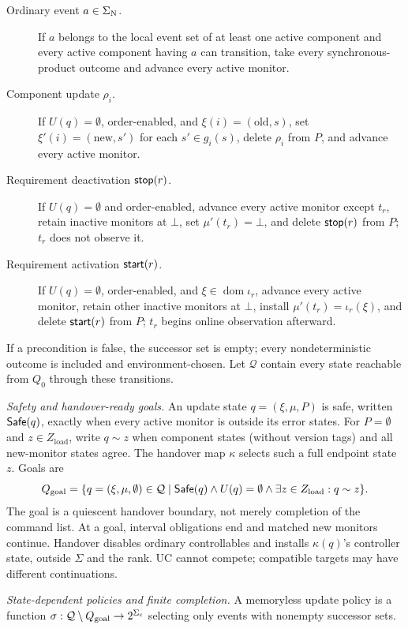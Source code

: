 \begin{description}
  \item[Ordinary event $a\in\Sigma_{\mathrm{N}}$.]
  If $a$ belongs to the local event set of at least one active component and every active component having $a$ can transition, take every synchronous-product outcome and advance every active monitor.

  \item[Component update $\rho_i$.]
  If $U(q)=\emptyset$, order-enabled, and $\xi(i)=(\mathrm{old},s)$, set $\xi'(i)=(\mathrm{new},s')$ for each $s'\in g_i(s)$, delete $\rho_i$ from $P$, and advance every active monitor.

  \item[Requirement deactivation $\mathsf{stop}(r)$.]
  If $U(q)=\emptyset$ and order-enabled, advance every active monitor except $t_r$, retain inactive monitors at $\bot$, set $\mu'(t_r)=\bot$, and delete $\mathsf{stop}(r)$ from $P$; $t_r$ does not observe it.

  \item[Requirement activation $\mathsf{start}(r)$.]
  If $U(q)=\emptyset$, order-enabled, and $\xi\in\operatorname{dom}\iota_r$, advance every active monitor, retain other inactive monitors at $\bot$, install $\mu'(t_r)=\iota_r(\xi)$, and delete $\mathsf{start}(r)$ from $P$; $t_r$ begins online observation afterward.
\end{description}
If a precondition is false, the successor set is empty; every nondeterministic outcome is included and environment-chosen.
Let $\mathcal Q$ contain every state reachable from $Q_0$ through these transitions. 
\par\noindent\emph{Safety and handover-ready goals.}
\label{def:safe_goal}
An update state $q=(\xi,\mu,P)$ is safe, written $\mathsf{Safe}(q)$, exactly when every active monitor is outside its error states.
For $P=\emptyset$ and $z\in Z_{\mathrm{load}}$, write $q\sim z$ when component states (without version tags) and all new-monitor states agree. The handover map $\kappa$ selects such a full endpoint state $z$. Goals are
\begin{equation}
Q_{\mathrm{goal}}=\{q=(\xi,\mu,\emptyset)\in\mathcal Q\mid
\mathsf{Safe}(q)\land U(q)=\emptyset\land\exists z\in Z_{\mathrm{load}}:q\sim z\}.
\label{eq:goal}
\end{equation}
The goal is a quiescent handover boundary, not merely completion of the command list. At a goal, interval obligations end and matched new monitors continue. Handover disables ordinary controllables and installs $\kappa(q)$'s controller state, outside $\Sigma$ and the rank. UC cannot compete; compatible targets may have different continuations.
\par\noindent\emph{State-dependent policies and finite completion.}
\label{def:strategy}
A memoryless update policy is a function
$\sigma:\mathcal Q\setminus Q_{\mathrm{goal}}\to2^{\Sigma_{\mathrm{c}}}$ selecting only events with nonempty successor sets.

